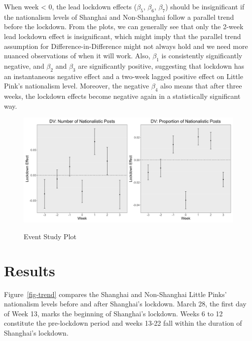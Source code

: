 \documentclass[12pt, ]{article}
\begin{document}
 When week < 0, the lead lockdown effects (\( \beta_{5} \), \( \beta_{6} \), \( \beta_{7} \)) should be insignificant if the nationalism levels of Shanghai and Non-Shanghai follow a parallel trend before the lockdown. From the plots, we can generally see that only the 2-week lead lockdown effect is insignificant, which might imply that the parallel trend assumption for Difference-in-Difference might not always hold and we need more nuanced observations of when it will work. Also, \( \beta_{1} \) is consistently significantly negative, and \( \beta_{2} \) and \( \beta_{3} \) are significantly positive, suggesting that lockdown has an instantaneous negative effect and a two-week lagged positive effect on Little Pink’s nationalism level. Moreover, the negative \( \beta_{4} \) also means that after three weeks, the lockdown effects become negative again in a statistically significant way.

\begin{figure}[]

{\centering \includegraphics[width=1\textwidth,height=\textheight]{figures/Event_study.png}}
\caption{\label{fig-event}Event Study Plot}

\end{figure}



\hypertarget{results}{%
\section{Results}\label{results}}

Figure~\ref{fig-trend} compares the Shanghai and Non-Shanghai Little Pinks’ nationalism levels before and after Shanghai’s lockdown. March 28, the first day of Week 13, marks the beginning of Shanghai’s lockdown. Weeks 6 to 12 constitute the pre-lockdown period and weeks 13-22 fall within the duration of Shanghai’s lockdown. 
\end{document}
